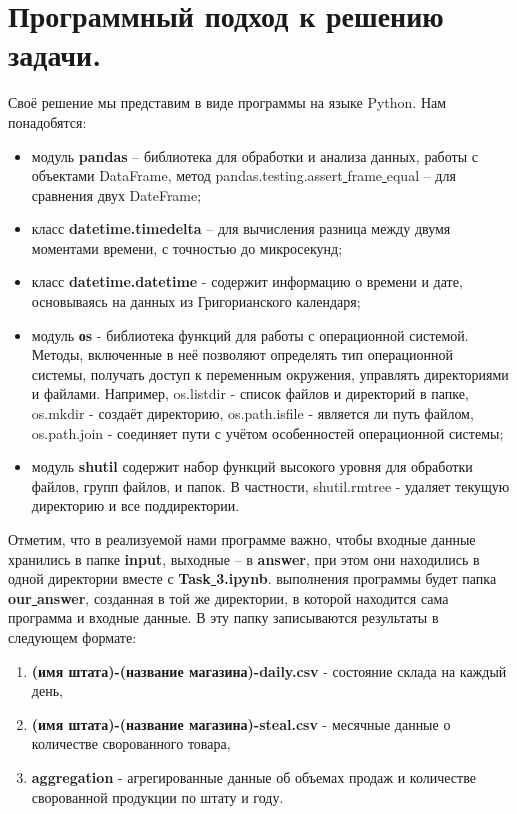 \documentclass{article}
\begin{document}
\section{Программный подход к решению задачи.}
Своё решение мы представим в виде программы на языке Python. Нам понадобятся:
\begin{itemize}
  \item модуль \textbf{pandas} – библиотека для обработки и анализа данных, 
работы с объектами DataFrame, метод pandas.testing.assert\underline{ }frame\underline{ }equal 
– для сравнения двух DateFrame;
\item класс \textbf{datetime.timedelta} – для вычисления  разница между двумя моментами времени, 
с точностью до микросекунд;
\item класс \textbf{datetime.datetime} - содержит информацию о времени и дате, 
основываясь на данных из Григорианского календаря;
\item модуль \textbf{оs} - библиотека функций для работы с операционной системой. 
Методы, включенные в неё позволяют определять тип операционной системы, 
получать доступ к переменным окружения, управлять директориями и файлами. 
Например, os.listdir - список файлов и директорий в папке, 
os.mkdir  - создаёт директорию, os.path.isfile - является ли путь файлом, 
os.path.join - соединяет пути с учётом особенностей операционной системы;
\item модуль \textbf{shutil} содержит набор функций высокого уровня для обработки файлов, групп файлов, и папок. В частности, shutil.rmtree - удаляет текущую директорию и все поддиректории. 
      \end{itemize}
Отметим, что в реализуемой нами программе важно, 
чтобы входные данные хранились в папке \textbf{input}, выходные – в \textbf{answer}, 
при этом они находились в одной директории вместе с \textbf{Task\underline{ }3.ipynb}. 
 выполнения программы будет папка \textbf{our\underline{ }answer}, 
созданная в той же директории, в которой находится сама программа и входные данные. 
В эту папку записываются результаты в следующем формате:
\begin{enumerate} 
\item \textbf{(имя штата)-(название магазина)-daily.csv} - состояние склада на каждый день,
\item \textbf{(имя штата)-(название магазина)-steal.csv} - месячные данные о количестве сворованного товара,
\item \textbf{aggregation} - агрегированные данные об объемах продаж и количестве сворованной продукции по штату и году.
\end{enumerate}
\end{document}
